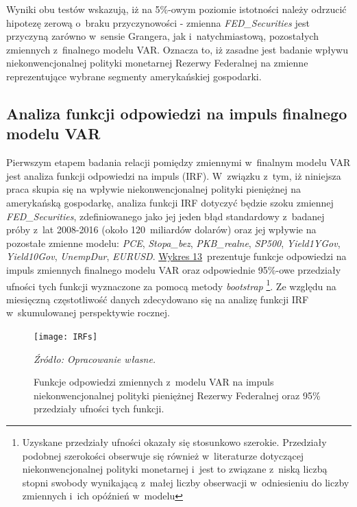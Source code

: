Wyniki obu testów wskazują, iż na 5\%-owym poziomie istotności należy odrzucić hipotezę zerową o~braku przyczynowości - zmienna \textit{FED_Securities} jest przyczyną zarówno w~sensie Grangera, jak i~natychmiastową, pozostałych zmiennych z~finalnego modelu \acs{VAR}. Oznacza to, iż zasadne jest badanie wpływu niekonwencjonalnej polityki monetarnej Rezerwy Federalnej na zmienne reprezentujące wybrane segmenty amerykańskiej gospodarki.

\subsection*{\normalsize{Analiza funkcji odpowiedzi na impuls finalnego modelu VAR}}

Pierwszym etapem badania relacji pomiędzy zmiennymi w~finalnym modelu \acs{VAR} jest analiza funkcji odpowiedzi na impuls (\acs{IRF}). W~związku z~tym, iż niniejsza praca skupia się na wpływie niekonwencjonalnej polityki pieniężnej na amerykańską gospodarkę, analiza funkcji \acs{IRF} dotyczyć będzie szoku zmiennej \textit{FED_Securities}, zdefiniowanego jako jej jeden błąd standardowy z~badanej próby z~lat 2008-2016 (około 120~miliardów dolarów) oraz jej wpływie na pozostałe zmienne modelu: \textit{PCE}, \textit{Stopa_bez}, \textit{PKB_realne}, \textit{SP500}, \textit{Yield1YGov}, \textit{Yield10Gov}, \textit{UnempDur}, \textit{EURUSD}. \hyperlink{fig14}{Wykres 13}~prezentuje funkcje odpowiedzi na impuls zmiennych finalnego modelu \acs{VAR} oraz odpowiednie 95\%-owe przedziały ufności tych funkcji wyznaczone za pomocą metody \textit{bootstrap} \footnote{Uzyskane przedziały ufności okazały się stosunkowo szerokie. Przedziały podobnej szerokości obserwuje się również w~literaturze dotyczącej niekonwencjonalnej polityki monetarnej i~jest to związane z~niską liczbą stopni swobody wynikającą z~małej liczby obserwacji w~odniesieniu do liczby zmiennych i~ich opóźnień w~modelu}. Ze względu na miesięczną częstotliwość danych zdecydowano się na analizę funkcji \acs{IRF} w~skumulowanej perspektywie rocznej.

\vspace{0.25cm}
\hypertarget{fig14}{}
\begin{figure}[h]
\begin{centering}
  \texttt{[image: IRFs]}
    \captionsetup{format=hang}
    \caption{Funkcje odpowiedzi zmiennych z~modelu VAR na impuls niekonwencjonalnej polityki pieniężnej Rezerwy Federalnej oraz 95\% przedziały ufności tych funkcji.}
\end{centering}
\begin{flushleft}
\vspace{-0.3cm}
\hspace{1cm}\textit{\footnotesize{Źródło: Opracowanie własne.}} \\
\end{flushleft}
\vspace{-0.5cm}
\end{figure}

